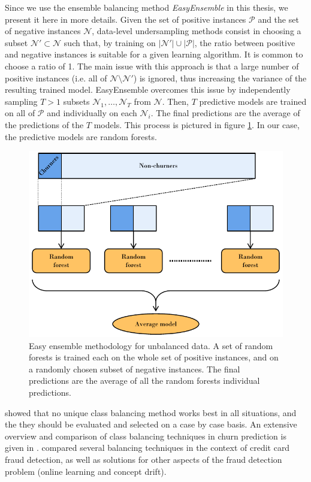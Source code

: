 Since we use the ensemble balancing method \emph{EasyEnsemble}
\parencite{liu2009exploratory} in this thesis, we present it here in more
details. Given the set of positive instances $\mathcal P$ and the set of
negative instances $\mathcal N$, data-level undersampling methods consist in
choosing a subset $\mathcal N'\subset \mathcal N$ such that, by training on
$|\mathcal N'|\cup|\mathcal P|$, the ratio between positive and negative
instances is suitable for a given learning algorithm. It is common to choose a
ratio of 1. The main issue with this approach is that a large number of positive
instances (i.e. all of $\mathcal N \setminus \mathcal N'$) is ignored, thus
increasing the variance of the resulting trained model. EasyEnsemble overcomes
this issue by independently sampling $T>1$ subsets $\mathcal N_1,\dots,\mathcal
N_T$ from $\mathcal N$. Then, $T$ predictive models are trained on all of
$\mathcal P$ and individually on each $\mathcal N_i$. The final predictions are
the average of the predictions of the $T$ models. This process is pictured in
figure \ref{fig:easy_ensemble_diagram}. In our case, the predictive models are
random forests.

\begin{figure}
    \centering
	\includegraphics[width=0.9\linewidth]{figures/easy_ensemble_diagram.pdf}
	\caption{Easy ensemble methodology for unbalanced data. A set of random
	forests is trained each on the whole set of positive instances, and on a
	randomly chosen subset of negative instances. The final predictions are
	the average of all the random forests individual predictions.}
	\label{fig:easy_ensemble_diagram}
\end{figure}

\textcite{dal2013racing} showed that no unique class balancing method works best
in all situations, and the they should be evaluated and selected on a case by
case basis. An extensive overview and comparison of class balancing techniques
in churn prediction is given in \parencite{zhu2017empirical}.
\textcite{dal2014learned} compared several balancing techniques in the context
of credit card fraud detection, as well as solutions for other aspects of the
fraud detection problem (online learning and concept drift).

